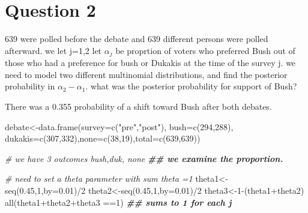 \documentclass[
]{book}
\newenvironment{Shaded}{\begin{snugshade}}{\end{snugshade}}
\newcommand{\AttributeTok}[1]{\textcolor[rgb]{0.77,0.63,0.00}{#1}}
\newcommand{\CommentTok}[1]{\textcolor[rgb]{0.56,0.35,0.01}{\textit{#1}}}
\newcommand{\DecValTok}[1]{\textcolor[rgb]{0.00,0.00,0.81}{#1}}
\newcommand{\DocumentationTok}[1]{\textcolor[rgb]{0.56,0.35,0.01}{\textbf{\textit{#1}}}}
\newcommand{\FloatTok}[1]{\textcolor[rgb]{0.00,0.00,0.81}{#1}}
\newcommand{\FunctionTok}[1]{\textcolor[rgb]{0.00,0.00,0.00}{#1}}
\newcommand{\NormalTok}[1]{#1}
\newcommand{\OtherTok}[1]{\textcolor[rgb]{0.56,0.35,0.01}{#1}}
\newcommand{\SpecialCharTok}[1]{\textcolor[rgb]{0.00,0.00,0.00}{#1}}
\newcommand{\StringTok}[1]{\textcolor[rgb]{0.31,0.60,0.02}{#1}}
\theoremstyle{definition}
\theoremstyle{definition}
\theoremstyle{definition}
\theoremstyle{definition}
\theoremstyle{remark}
\begin{document}
\hypertarget{question-2}{%
\section*{Question 2}\label{question-2}}

639 were polled before the debate and 639 different persons were polled afterward. we let j=1,2 let \(\alpha_j\) be proprtion of voters who preferred Bush out of those who had a preference for bush or Dukakis at the time of the survey j. we need to model two different multinomial distributions, and find the posterior probability in \(\alpha_2-\alpha_1\). what was the posterior probability for support of Bush?

There was a 0.355 probability of a shift toward Bush after both debates.

\begin{Shaded}
\begin{Highlighting}[]
\NormalTok{debate}\OtherTok{\textless{}{-}}\FunctionTok{data.frame}\NormalTok{(}\AttributeTok{survey=}\FunctionTok{c}\NormalTok{(}\StringTok{"pre"}\NormalTok{,}\StringTok{"post"}\NormalTok{), }\AttributeTok{bush=}\FunctionTok{c}\NormalTok{(}\DecValTok{294}\NormalTok{,}\DecValTok{288}\NormalTok{), }\AttributeTok{dukakis=}\FunctionTok{c}\NormalTok{(}\DecValTok{307}\NormalTok{,}\DecValTok{332}\NormalTok{),}\AttributeTok{none=}\FunctionTok{c}\NormalTok{(}\DecValTok{38}\NormalTok{,}\DecValTok{19}\NormalTok{),}\AttributeTok{total=}\FunctionTok{c}\NormalTok{(}\DecValTok{639}\NormalTok{,}\DecValTok{639}\NormalTok{))}

\CommentTok{\# we have 3 outcomes bush,duk, none}
\DocumentationTok{\#\# we examine the proportion.}

\CommentTok{\# need to set a theta parameter with sum theta =1}
\NormalTok{ theta1}\OtherTok{\textless{}{-}}\FunctionTok{seq}\NormalTok{(}\FloatTok{0.45}\NormalTok{,}\DecValTok{1}\NormalTok{,}\AttributeTok{by=}\FloatTok{0.01}\NormalTok{)}\SpecialCharTok{/}\DecValTok{2}
\NormalTok{ theta2}\OtherTok{\textless{}{-}}\FunctionTok{seq}\NormalTok{(}\FloatTok{0.45}\NormalTok{,}\DecValTok{1}\NormalTok{,}\AttributeTok{by=}\FloatTok{0.01}\NormalTok{)}\SpecialCharTok{/}\DecValTok{2}
\NormalTok{ theta3}\OtherTok{\textless{}{-}}\DecValTok{1}\SpecialCharTok{{-}}\NormalTok{(theta1}\SpecialCharTok{+}\NormalTok{theta2)}
 \FunctionTok{all}\NormalTok{(theta1}\SpecialCharTok{+}\NormalTok{theta2}\SpecialCharTok{+}\NormalTok{theta3 }\SpecialCharTok{==}\DecValTok{1}\NormalTok{) }\DocumentationTok{\#\# sums to  1 for each j}
\end{Highlighting}
\end{Shaded}
\end{document}
